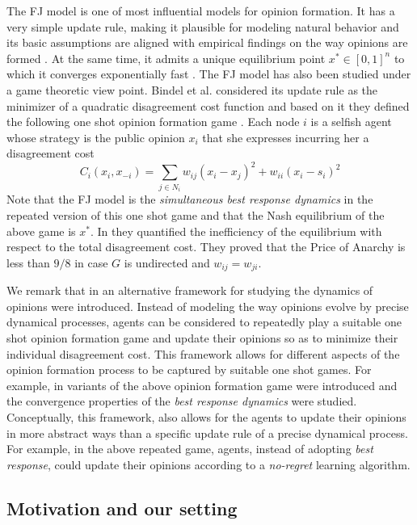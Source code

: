 The FJ model is one of most influential models for opinion formation. It has
a very simple update rule, making it plausible for modeling natural behavior
and its basic assumptions are aligned with empirical findings on the way
opinions are formed \cite{AFH05,K47}.  At the same time, it admits a unique
equilibrium point $x^* \in [0,1]^n$ to which it converges exponentially fast
\cite{GS14}.  The FJ model has also been studied under a game theoretic view
point.  Bindel et al. considered its update rule as the minimizer of a
quadratic disagreement cost function and based on it they defined the following
one shot opinion formation game \cite{BKO11}. Each node $i$ is a selfish agent
whose strategy is the public opinion $x_i$ that she expresses incurring her a 
disagreement cost
%
\begin{equation}\label{eq:BKO_cost}
  C_i(x_i,x_{-i})= \sum_{j \in N_i}w_{ij} (x_i-x_j)^2 + w_{ii}(x_i-s_i)^2
\end{equation}
%
Note that the FJ model is the \emph{simultaneous best response dynamics} in the
repeated version of this one shot game and that the Nash equilibrium of the
above game is $x^*$. In \cite{BKO11} they quantified the inefficiency of the
equilibrium with respect to the total disagreement cost. They proved that 
the Price of Anarchy is less than $9/8$ in case $G$ is undirected and 
$w_{ij}=w_{ji}$. 

We remark that in \cite{BKO11} an alternative framework for studying 
the dynamics of opinions were introduced. Instead of
modeling the way opinions evolve by precise dynamical processes, agents can be
considered to repeatedly play a suitable one shot opinion formation game and
update their opinions so as to minimize their individual disagreement cost.
This framework allows for different aspects of the opinion formation process to
be captured by suitable one shot games.  For example, in \cite{BGM13,EFHS17}
variants of the above opinion formation game were introduced and the
convergence properties of the \emph{best response dynamics} were studied.
Conceptually, this framework, also allows for the agents to update their
opinions in more abstract ways than a specific update rule of a precise
dynamical process.  For example, in the above repeated game, agents, instead of
adopting \emph{best response}, could update their opinions according to a
\emph{no-regret} learning algorithm.

\subsection{Motivation and our setting}

